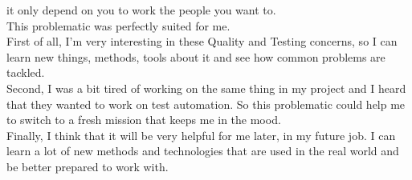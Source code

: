 it only depend on you to work the people you want to. \\
\newline
This problematic was perfectly suited for me. \\
First of all, I'm very interesting in these Quality and Testing concerns,
so I can learn new things, methods, tools about it and see how common
problems are tackled. \\
Second, I was a bit tired of working on the same thing in my project and
I heard that they wanted to work on test automation.
So this problematic could help me to switch to a fresh mission that keeps
me in the mood. \\
Finally, I think that it will be very helpful for me later, in my future
job.
I can learn a lot of new methods and technologies that are used in the
real world and be better prepared to work with.
